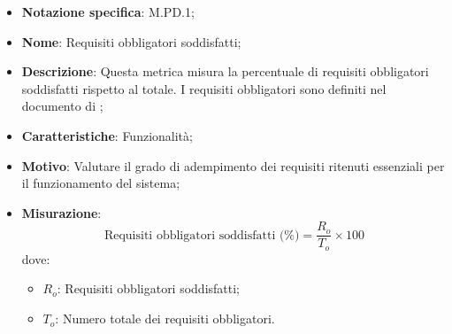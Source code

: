 \begin{itemize}
    \item \textbf{Notazione specifica}: M.PD.1;
    \item \textbf{Nome}: Requisiti obbligatori soddisfatti;
    \item \textbf{Descrizione}: Questa metrica misura la percentuale di requisiti obbligatori soddisfatti rispetto al totale. I requisiti obbligatori sono definiti nel documento di \AnalisiDeiRequisiti;
    \item \textbf{Caratteristiche}: Funzionalità;
    \item \textbf{Motivo}: Valutare il grado di adempimento dei requisiti ritenuti essenziali per il funzionamento del sistema;
    \item \textbf{Misurazione}:
    \[
    \text{Requisiti obbligatori soddisfatti (\%)} = \frac{R_{o}}{T_{o}} \times 100
    \]
    dove:
    \begin{itemize}
        \item $R_{o}$: Requisiti obbligatori soddisfatti;
        \item $T_{o}$: Numero totale dei requisiti obbligatori.
    \end{itemize}
\end{itemize}
